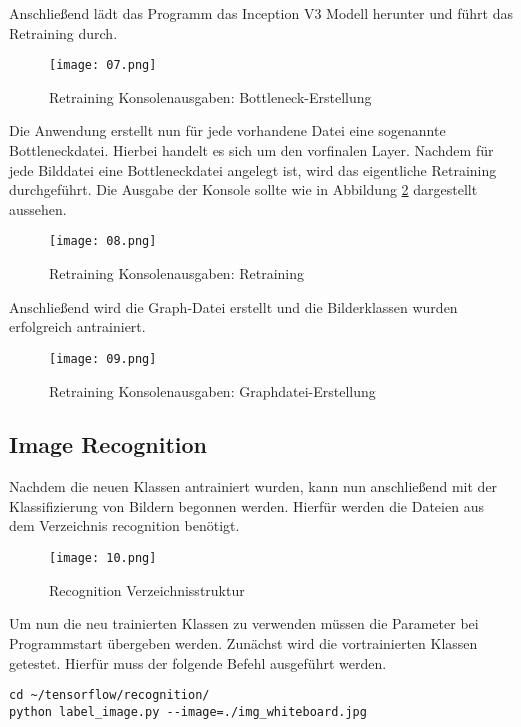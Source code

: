 Anschließend lädt das Programm das Inception V3 Modell herunter und führt das Retraining durch.

\begin{figure}[!h]
	\texttt{[image: 07.png]}
	\caption{Retraining Konsolenausgaben: Bottleneck-Erstellung}
	\label{fig:07}
\end{figure}

Die Anwendung erstellt nun für jede vorhandene Datei eine sogenannte Bottleneckdatei. Hierbei handelt es sich um den vorfinalen Layer. Nachdem für jede Bilddatei eine Bottleneckdatei angelegt ist, wird das eigentliche Retraining durchgeführt. Die Ausgabe der Konsole sollte wie in Abbildung \ref{fig:08} dargestellt aussehen.

\begin{figure}[!h]
	\texttt{[image: 08.png]}
	\caption{Retraining Konsolenausgaben: Retraining}
	\label{fig:08}
\end{figure}

Anschließend wird die Graph-Datei erstellt und die Bilderklassen wurden erfolgreich antrainiert.

\begin{figure}[!h]
	\texttt{[image: 09.png]}
	\caption{Retraining Konsolenausgaben: Graphdatei-Erstellung}
	\label{fig:09}
\end{figure}

\subsection{Image Recognition}
\label{subsec:trans-erstellung-mit-daten}
Nachdem die neuen Klassen antrainiert wurden, kann nun anschließend mit der Klassifizierung von Bildern begonnen werden. Hierfür werden die Dateien aus dem Verzeichnis \glqq{}recognition\grqq{} benötigt.

\begin{figure}[!h]
	\texttt{[image: 10.png]}
	\caption{Recognition Verzeichnisstruktur}
	\label{fig:10}
\end{figure}

Um nun die neu trainierten Klassen zu verwenden müssen die Parameter bei Programmstart übergeben werden. Zunächst wird die vortrainierten Klassen getestet. Hierfür muss der folgende Befehl ausgeführt werden.

\begin{lstlisting}[frame=single]
cd ~/tensorflow/recognition/
python label_image.py --image=./img_whiteboard.jpg
\end{lstlisting}

